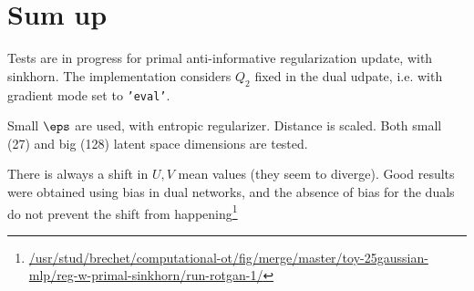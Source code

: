 \documentclass[11pt,a4paper]{article}
\begin{document}
\section*{Sum up}
Tests are in progress for primal anti-informative regularization update, with sinkhorn.
The implementation considers $Q_2$ fixed in the dual udpate, i.e. with gradient mode set to \texttt{'eval'}.

Small $\eps$ are used, with entropic regularizer. Distance is scaled. Both small (27) and big (128) latent space dimensions are tested.

There is always a shift in $U, V$ mean values (they seem to diverge). Good
results were obtained using bias in dual networks, and the absence of bias for
the duals do not prevent the shift from happening\footnote{\url{/usr/stud/brechet/computational-ot/fig/merge/master/toy-25gaussian-mlp/reg-w-primal-sinkhorn/run-rotgan-1/}}




\printbibliography{}
\end{document}
